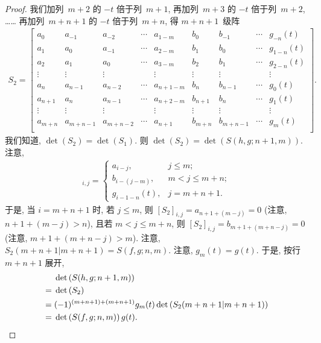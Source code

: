 \documentclass[../libro.tex]{subfiles}
\begin{document}
\begin{proof}
    我们加列~\(m+2\) 的 \(-t\) 倍于列~\(m+1\),
    再加列~\(m+3\) 的 \(-t\) 倍于列~\(m+2\),
    ……
    再加列~\(m+n+1\) 的 \(-t\) 倍于列~\(m+n\),
    得 \(m+n+1\)~级阵
    \begin{align*}
        S_2 =
        \begin{bmatrix}
            a_{0}   & a_{-1}    & a_{-2}    & \cdots & a_{1-m}   & b_{0}   & b_{-1}    & \cdots & g_{-n} (t)  \\
            a_{1}   & a_{0}     & a_{-1}    & \cdots & a_{2-m}   & b_{1}   & b_{0}     & \cdots & g_{1-n} (t) \\
            a_{2}   & a_{1}     & a_{0}     & \cdots & a_{3-m}   & b_{2}   & b_{1}     & \cdots & g_{2-n} (t) \\
            \vdots  & \vdots    & \vdots    & {}     & \vdots    & \vdots  & \vdots    & {}     & \vdots      \\
            a_{n}   & a_{n-1}   & a_{n-2}   & \cdots & a_{n+1-m} & b_{n}   & b_{n-1}   & \cdots & g_{0} (t)   \\
            a_{n+1} & a_{n}     & a_{n-1}   & \cdots & a_{n+2-m} & b_{n+1} & b_{n}     & \cdots & g_{1} (t)   \\
            \vdots  & \vdots    & \vdots    & {}     & \vdots    & \vdots  & \vdots    & {}     & \vdots      \\
            a_{m+n} & a_{m+n-1} & a_{m+n-2} & \cdots & a_{n+1}   & b_{m+n} & b_{m+n-1} & \cdots & g_{m} (t)   \\
        \end{bmatrix}.
    \end{align*}
    我们知道, \(\det {(S_2)} = \det {(S_1)}\).
    则 \(\det {(S_2)} = \det {(S(h, g; n+1, m))}\).
    注意,
    \begin{align*}
        [S_2]_{i,j} =
        \begin{cases}
            a_{i-j},       & j \leq m;         \\
            b_{i-(j-m)},   & m < j \leq m + n; \\
            g_{i-1-n} (t), & j = m + n + 1.
        \end{cases}
    \end{align*}
    于是, 当 \(i = m + n + 1\) 时,
    若 \(j \leq m\),
    则 \([S_2]_{i,j} = a_{n+1+(m-j)} = 0\)
    (注意, \(n+1+(m-j) > n\)),
    且若 \(m < j \leq m + n\),
    则 \([S_2]_{i,j} = b_{m+1+(m+n-j)} = 0\)
    (注意, \(m+1+(m+n-j) > m\)).
    注意, \(S_2 ({m+n+1}|{m+n+1}) = S(f, g; n, m)\).
    注意, \(g_m (t) = g(t)\).
    于是, 按行~\(m+n+1\) 展开,
    \begin{align*}
        &
        \det {(S(h, g; n+1, m))}
        \\
        = {} &
        \det {(S_2)}
        \\
        = {} &
        (-1)^{(m+n+1) + (m+n+1)} g_m (t) \det {(S_2 ({m+n+1}|{m+n+1}))}
        \\
        = {} &
        \det {(S(f, g; n, m))}\, g(t).
        \qedhere
    \end{align*}
\end{proof}
\end{document}
